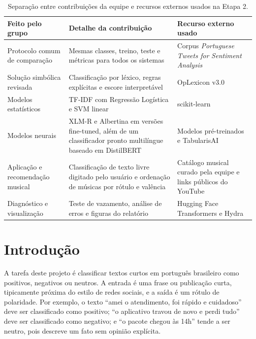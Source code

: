 \documentclass[11pt,a4paper]{article}
\newcommand{\altrowcolors}{\rowcolors{2}{black!4}{white}}
\newcommand{\clearrowcolors}{\rowcolors{2}{}{}}
\begin{document}
\begin{table}[h]
\small
\centering
\renewcommand{\arraystretch}{1.18}
\altrowcolors
\begin{tabularx}{\linewidth}{@{}L{4.2cm}Y Y@{}}
\toprule
\textbf{Feito pelo grupo} & \textbf{Detalhe da contribuição} & \textbf{Recurso externo usado} \\
\midrule
Protocolo comum de comparação & Mesmas classes, treino, teste e métricas para todos os sistemas & Corpus \emph{Portuguese Tweets for Sentiment Analysis} \citep{augustopKaggleTweets} \\
\addlinespace[0.25em]
Solução simbólica revisada & Classificação por léxico, regras explícitas e escore interpretável & OpLexicon v3.0 \citep{souza2011construction} \\
\addlinespace[0.25em]
Modelos estatísticos & TF-IDF com Regressão Logística e SVM linear & scikit-learn \citep{pedregosa2011scikit} \\
\addlinespace[0.25em]
Modelos neurais & XLM-R e Albertina em versões fine-tuned, além de um classificador pronto multilíngue baseado em DistilBERT & Modelos pré-treinados e TabularisAI \citep{sanh2019distilbert,conneau2020xlmr,rodrigues2023albertina,tabularisai2025multilingualsentiment} \\
\addlinespace[0.25em]
Aplicação e recomendação musical & Classificação de texto livre digitado pelo usuário e ordenação de músicas por rótulo e valência & Catálogo musical curado pela equipe e links públicos do YouTube \\
\addlinespace[0.25em]
Diagnóstico e visualização & Teste de vazamento, análise de erros e figuras do relatório & Hugging Face Transformers e Hydra \\
\bottomrule
\end{tabularx}
\clearrowcolors
\caption{Separação entre contribuições da equipe e recursos externos usados na Etapa 2.}
\label{tab:autoria}
\end{table}

\section{Introdução}

A tarefa deste projeto é classificar textos curtos em português brasileiro como positivos, negativos ou neutros. A entrada é uma frase ou publicação curta, tipicamente próxima do estilo de redes sociais, e a saída é um rótulo de polaridade. Por exemplo, o texto ``amei o atendimento, foi rápido e cuidadoso'' deve ser classificado como positivo; ``o aplicativo travou de novo e perdi tudo'' deve ser classificado como negativo; e ``o pacote chegou às 14h'' tende a ser neutro, pois descreve um fato sem opinião explícita.
\end{document}
